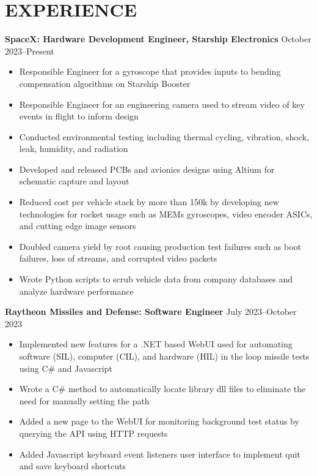 \documentclass{article}
\begin{document}
\section{EXPERIENCE}
\textbf{SpaceX: Hardware Development Engineer, Starship Electronics}
\hfill
\vspace{0.5em}
October 2023--Present
\begin{itemize}
\item{ Responsible Engineer for a gyroscope that provides inputs to bending compensation algorithms on Starship Booster }
\item{ Responsible Engineer for an engineering camera used to stream video of key events in flight to inform design }
\item{ Conducted environmental testing including thermal cycling, vibration, shock, leak, humidity, and radiation}
\item{ Developed and released PCBs and avionics designs using Altium for schematic capture and layout}
\item{ Reduced cost per vehicle stack by more than 150k by developing new technologies for rocket usage such as MEMs gyroscopes, video encoder ASICs, and cutting edge image sensors }
\item{ Doubled camera yield by root causing production test failures such as boot failures, loss of streams, and corrupted video packets}
\item{ Wrote Python scripts to scrub vehicle data from company databases and analyze hardware performance }
\end{itemize}
\vspace{1em}
\textbf{Raytheon Missiles and Defense: Software Engineer}
\hfill
\vspace{0.5em}
July 2023--October 2023
\begin{itemize}
\item{Implemented new features for a .NET based WebUI used for automating software (SIL), computer (CIL), and hardware (HIL) in the loop missile tests using C\# and Javascript}
\item{Wrote a C\# method to automatically locate library dll files to eliminate the need for manually setting the path}
\item{Added a new page to the WebUI for monitoring background test status by querying the API using HTTP requests}
\item{Added Javascript keyboard event listeners user interface to implement quit and save keyboard shortcuts}
\end{itemize}
\end{document}
